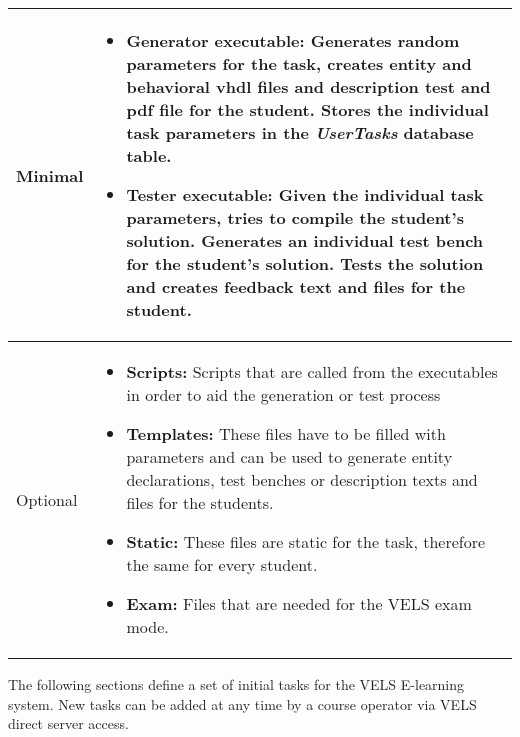     
\begin{tabular}{|p{3cm}|p{10cm}|}
\hline

Minimal  & \begin{itemize}
    \item {\bf Generator executable:} Generates random parameters for the task, creates entity 
        and behavioral vhdl files and description test and pdf file for the student. Stores the 
        individual task parameters in the \textit{UserTasks} database table.  
    \item {\bf Tester executable:} Given the individual task parameters, tries to compile the 
        student's solution. Generates an individual test bench for the student's solution. Tests 
        the solution and creates feedback text and files for the student. 
    \end{itemize} 
\\
\hline
Optional & \begin{itemize}
    \item {\bf Scripts:} Scripts that are called from the executables in order to aid the 
        generation or test process
    \item {\bf Templates:} These files have to be filled with parameters and can be used to generate entity 
        declarations, test benches or description texts and files for the students.
    \item {\bf Static:} These files are static for the task, therefore the same for every student.
    \item {\bf Exam:} Files that are needed for the VELS exam mode.
\end{itemize} 
\\
\hline
\end{tabular} 


The following sections define a set of initial tasks for the VELS E-learning system. New tasks 
can be added at any time by a course operator via VELS direct server access.
